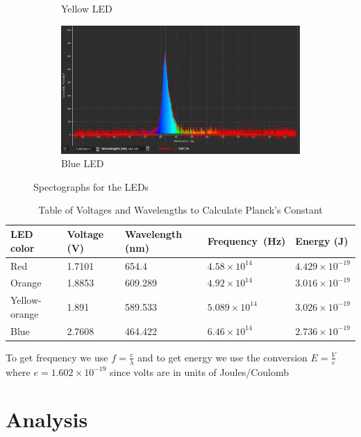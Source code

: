 \documentclass{article}[12pt]
\begin{document}
\begin{figure} [H]
\begin{subfigure} [b]{0.475\textwidth}
    \caption{Yellow LED}
  \end{subfigure}
  \hfill
  \begin{subfigure} [b]{0.475\textwidth}
    \centering
    \includegraphics[width=\textwidth]{figures/blue_led.PNG}
    \caption{Blue LED}
  \end{subfigure}
  \caption{Spectographs for the LEDs}
\end{figure}

\begin{table} [H]
  \centering
  \begin{tabular}{|l|l|l|l|l|}
    \hline
    LED color	 & 	Voltage (V)	 & 	Wavelength (nm)	 & 	Frequency (Hz)	 & 	Energy (J) \\ \hline
    Red	 & 	1.7101	 & 	654.4	 & 	$ 4.58 \times 10 ^{14} $	 & 	$ 4.429 \times 10^{-19} $ \\ \hline
    Orange	 & 	1.8853	 & 	609.289	 & 	$ 4.92 \times 10 ^{14} $	 & 	$ 3.016 \times 10^{-19} $ \\ \hline
    Yellow-orange	 & 	1.891	 & 	589.533	 & 	$ 5.089 \times 10 ^{14} $	 & 	$ 3.026 \times 10^{-19} $ \\ \hline
    Blue	 & 	2.7608	 & 	464.422	 & 	$ 6.46 \times 10 ^{14} $	 & 	$ 2.736 \times 10^{-19} $ \\ \hline
  \end{tabular}

    \caption{Table of Voltages and Wavelengths to Calculate Planck's Constant}
  \label{table1}

\end{table}

To get frequency we use $ f = \frac{c}{\lambda } $ and to get energy we use the conversion $ E = \frac{V}{e} $ where $ e = 1.602 \times 10^{-19}  $ since volts are in units of Joules/Coulomb

\section{Analysis}
\end{document}
